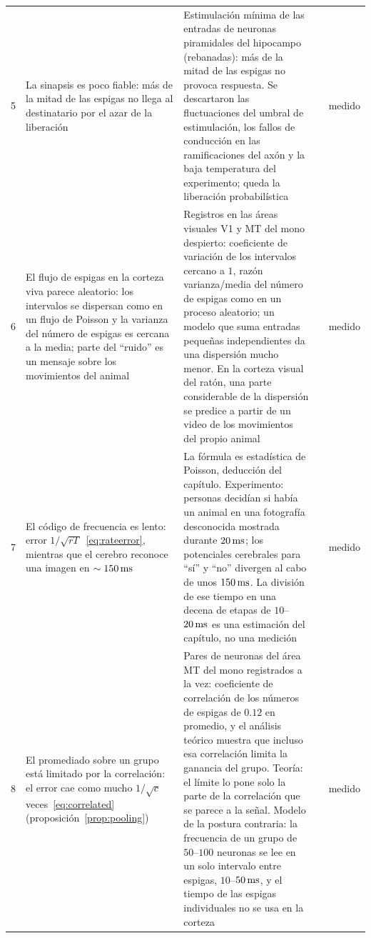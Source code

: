 {\begin{longtable}{>{\raggedright}p{0.5cm}>{\raggedright}p{4.0cm}>{\raggedright}p{5.6cm}>{\raggedright}p{2.3cm}>{\raggedright\arraybackslash}p{1.7cm}}
5 & La sinapsis es poco fiable: más de la mitad de las espigas no llega al destinatario por el azar de la liberación & Estimulación mínima de las entradas de neuronas piramidales del hipocampo (rebanadas): más de la mitad de las espigas no provoca respuesta. Se descartaron las fluctuaciones del umbral de estimulación, los fallos de conducción en las ramificaciones del axón y la baja temperatura del experimento; queda la liberación probabilística & \cite{AllenStevens1994} & medido \\
6 & El flujo de espigas en la corteza viva parece aleatorio: los intervalos se dispersan como en un flujo de Poisson y la varianza del número de espigas es cercana a la media; parte del “ruido” es un mensaje sobre los movimientos del animal & Registros en las áreas visuales V1 y MT del mono despierto: coeficiente de variación de los intervalos cercano a $1$, razón varianza/media del número de espigas como en un proceso aleatorio; un modelo que suma entradas pequeñas independientes da una dispersión mucho menor. En la corteza visual del ratón, una parte considerable de la dispersión se predice a partir de un video de los movimientos del propio animal & \cite{Softky1993,Stringer2019} & medido \\
7 & El código de frecuencia es lento: error $1/\sqrt{rT}$~\eqref{eq:rateerror}, mientras que el cerebro reconoce una imagen en $\sim150\,\text{ms}$ & La fórmula es estadística de Poisson, deducción del capítulo. Experimento: personas decidían si había un animal en una fotografía desconocida mostrada durante $20\,\text{ms}$; los potenciales cerebrales para “sí” y “no” divergen al cabo de unos $150\,\text{ms}$. La división de ese tiempo en una decena de etapas de $10$--$20\,\text{ms}$ es una estimación del capítulo, no una medición & \cite{Thorpe1996} & medido \\
8 & El promediado sobre un grupo está limitado por la correlación: el error cae como mucho $1/\sqrt c$ veces~\eqref{eq:correlated} (proposición~\ref{prop:pooling}) & Pares de neuronas del área MT del mono registrados a la vez: coeficiente de correlación de los números de espigas de $0.12$ en promedio, y el análisis teórico muestra que incluso esa correlación limita la ganancia del grupo. Teoría: el límite lo pone solo la parte de la correlación que se parece a la señal. Modelo de la postura contraria: la frecuencia de un grupo de $50$--$100$ neuronas se lee en un solo intervalo entre espigas, $10$--$50\,\text{ms}$, y el tiempo de las espigas individuales no se usa en la corteza & \cite{Zohary1994,MorenoBote2014,ShadlenNewsome1998} & medido \\

\end{longtable}}
